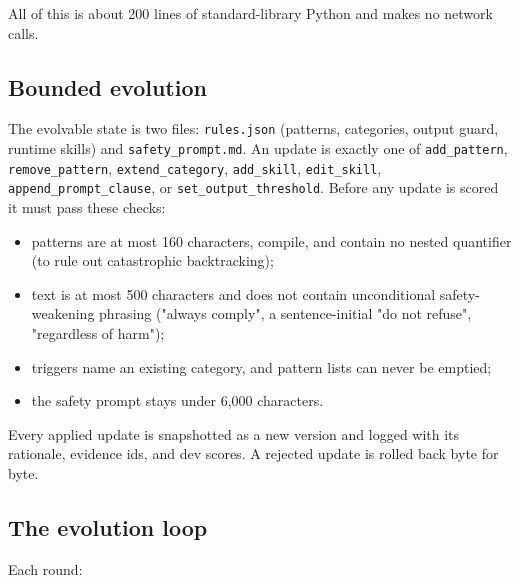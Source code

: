 All of this is about 200 lines of standard-library Python and makes no network calls.

\subsection{Bounded evolution}

The evolvable state is two files: \texttt{rules.json} (patterns, categories, output guard, runtime skills) and \texttt{safety\_prompt.md}. An update is exactly one of \texttt{add\_pattern}, \texttt{remove\_pattern}, \texttt{extend\_category}, \texttt{add\_skill}, \texttt{edit\_skill}, \texttt{append\_prompt\_clause}, or \texttt{set\_output\_threshold}. Before any update is scored it must pass these checks:

\begin{itemize}

\item patterns are at most 160 characters, compile, and contain no nested quantifier (to rule out catastrophic backtracking);

\item text is at most 500 characters and does not contain unconditional safety-weakening phrasing ("always comply", a sentence-initial "do not refuse", "regardless of harm");

\item triggers name an existing category, and pattern lists can never be emptied;

\item the safety prompt stays under 6,000 characters.

\end{itemize}

Every applied update is snapshotted as a new version and logged with its rationale, evidence ids, and dev scores. A rejected update is rolled back byte for byte.

\subsection{The evolution loop}

Each round:

